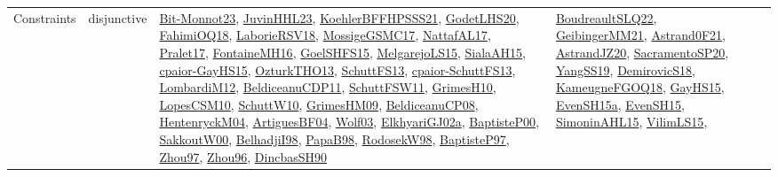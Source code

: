 {\begin{longtable}{lp{3cm}>{\raggedright}p{6cm}>{\raggedright}p{6cm}p{8cm}}
Constraints & disjunctive & \href{papers/Bit-Monnot23.pdf}{Bit-Monnot23}\cite{Bit-Monnot23}, \href{papers/JuvinHHL23.pdf}{JuvinHHL23}\cite{JuvinHHL23}, \href{articles/KoehlerBFFHPSSS21.pdf}{KoehlerBFFHPSSS21}\cite{KoehlerBFFHPSSS21}, \href{papers/GodetLHS20.pdf}{GodetLHS20}\cite{GodetLHS20}, \href{articles/FahimiOQ18.pdf}{FahimiOQ18}\cite{FahimiOQ18}, \href{articles/LaborieRSV18.pdf}{LaborieRSV18}\cite{LaborieRSV18}, \href{papers/MossigeGSMC17.pdf}{MossigeGSMC17}\cite{MossigeGSMC17}, \href{articles/NattafAL17.pdf}{NattafAL17}\cite{NattafAL17}, \href{papers/Pralet17.pdf}{Pralet17}\cite{Pralet17}, \href{papers/FontaineMH16.pdf}{FontaineMH16}\cite{FontaineMH16}, \href{articles/GoelSHFS15.pdf}{GoelSHFS15}\cite{GoelSHFS15}, \href{papers/MelgarejoLS15.pdf}{MelgarejoLS15}\cite{MelgarejoLS15}, \href{papers/SialaAH15.pdf}{SialaAH15}\cite{SialaAH15}, \href{papers/cpaior-GayHS15.pdf}{cpaior-GayHS15}\cite{cpaior-GayHS15}, \href{articles/OzturkTHO13.pdf}{OzturkTHO13}\cite{OzturkTHO13}, \href{papers/SchuttFS13.pdf}{SchuttFS13}\cite{SchuttFS13}, \href{papers/cpaior-SchuttFS13.pdf}{cpaior-SchuttFS13}\cite{cpaior-SchuttFS13}, \href{articles/LombardiM12.pdf}{LombardiM12}\cite{LombardiM12}, \href{articles/BeldiceanuCDP11.pdf}{BeldiceanuCDP11}\cite{BeldiceanuCDP11}, \href{articles/SchuttFSW11.pdf}{SchuttFSW11}\cite{SchuttFSW11}, \href{papers/GrimesH10.pdf}{GrimesH10}\cite{GrimesH10}, \href{articles/LopesCSM10.pdf}{LopesCSM10}\cite{LopesCSM10}, \href{papers/SchuttW10.pdf}{SchuttW10}\cite{SchuttW10}, \href{papers/GrimesHM09.pdf}{GrimesHM09}\cite{GrimesHM09}, \href{papers/BeldiceanuCP08.pdf}{BeldiceanuCP08}\cite{BeldiceanuCP08}, \href{papers/HentenryckM04.pdf}{HentenryckM04}\cite{HentenryckM04}, \href{papers/ArtiguesBF04.pdf}{ArtiguesBF04}\cite{ArtiguesBF04}, \href{papers/Wolf03.pdf}{Wolf03}\cite{Wolf03}, \href{papers/ElkhyariGJ02a.pdf}{ElkhyariGJ02a}\cite{ElkhyariGJ02a}, \href{articles/BaptisteP00.pdf}{BaptisteP00}\cite{BaptisteP00}, \href{articles/SakkoutW00.pdf}{SakkoutW00}\cite{SakkoutW00}, \href{articles/BelhadjiI98.pdf}{BelhadjiI98}\cite{BelhadjiI98}, \href{articles/PapaB98.pdf}{PapaB98}\cite{PapaB98}, \href{papers/RodosekW98.pdf}{RodosekW98}\cite{RodosekW98}, \href{papers/BaptisteP97.pdf}{BaptisteP97}\cite{BaptisteP97}, \href{articles/Zhou97.pdf}{Zhou97}\cite{Zhou97}, \href{papers/Zhou96.pdf}{Zhou96}\cite{Zhou96}, \href{articles/DincbasSH90.pdf}{DincbasSH90}\cite{DincbasSH90} & \href{papers/BoudreaultSLQ22.pdf}{BoudreaultSLQ22}\cite{BoudreaultSLQ22}, \href{papers/GeibingerMM21.pdf}{GeibingerMM21}\cite{GeibingerMM21}, \href{papers/Astrand0F21.pdf}{Astrand0F21}\cite{Astrand0F21}, \href{articles/AstrandJZ20.pdf}{AstrandJZ20}\cite{AstrandJZ20}, \href{articles/SacramentoSP20.pdf}{SacramentoSP20}\cite{SacramentoSP20}, \href{papers/YangSS19.pdf}{YangSS19}\cite{YangSS19}, \href{papers/DemirovicS18.pdf}{DemirovicS18}\cite{DemirovicS18}, \href{papers/KameugneFGOQ18.pdf}{KameugneFGOQ18}\cite{KameugneFGOQ18}, \href{papers/GayHS15.pdf}{GayHS15}\cite{GayHS15}, \href{articles/EvenSH15a.pdf}{EvenSH15a}\cite{EvenSH15a}, \href{papers/EvenSH15.pdf}{EvenSH15}\cite{EvenSH15}, \href{articles/SimoninAHL15.pdf}{SimoninAHL15}\cite{SimoninAHL15}, \href{papers/VilimLS15.pdf}{VilimLS15}\cite{VilimLS15}, 
\end{longtable}}
